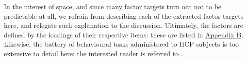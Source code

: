 \documentclass{article}
\begin{document}

%

In the interest of space, and since many factor targets turn out not to be
predictable at all, we refrain from describing each of the extracted factor
targets here, and relegate such explanation to the discussion. Ultimately,
the factors are defined by the loadings of their respective items: these are
listed in \hyperref[sec:appendix-b]{Appendix B}. Likewise, the battery of
behavioural tasks administered to HCP subjects is too extensive to detail
here: the interested reader is referred to \citet{Barch2013}.
\end{document}
